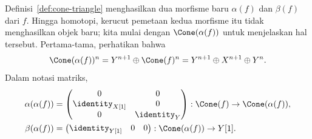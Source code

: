 Definisi~\ref{def:cone-triangle} menghasilkan dua morfisme baru
$\alpha(f)$ dan $\beta(f)$ dari $f$. Hingga homotopi, kerucut pemetaan kedua
morfisme itu tidak menghasilkan objek baru; kita mulai dengan
$\Cone(\alpha(f))$ untuk menjelaskan hal tersebut. Pertama-tama, perhatikan
bahwa
\[ \Cone(\alpha(f))^n = Y^{n+1} \oplus \Cone(f)^n = Y^{n+1} \oplus X^{n+1} \oplus Y^n. \]
Dalam notasi matriks,
\begin{align*}
	\alpha(\alpha(f)) & = \begin{pmatrix}
		0 & 0 \\
		\identity_{X[1]} & 0 \\
		0 & \identity_Y
	\end{pmatrix} : \Cone(f) \to \Cone(\alpha(f)) , \\
	\beta(\alpha(f)) & = \begin{pmatrix}
		\identity_{Y[1]} & 0 & 0
	\end{pmatrix} : \Cone(\alpha(f)) \to Y[1].
\end{align*}

